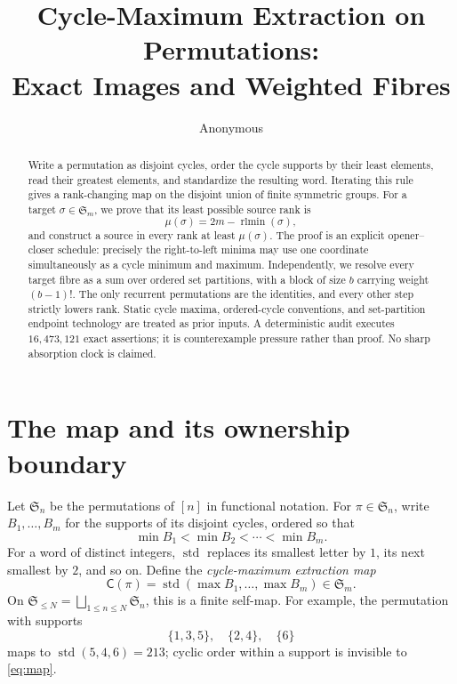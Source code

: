 \documentclass[a4paper,10pt]{amsart}
\title[Cycle-maximum extraction]{Cycle-Maximum Extraction on Permutations:\\
Exact Images and Weighted Fibres}
\author{Anonymous}
\date{}
\theoremstyle{remark}
\newcommand{\Sym}{\mathfrak S}
\newcommand{\std}{\operatorname{std}}
\newcommand{\CME}{\mathsf C}
\newcommand{\rtlmin}{\operatorname{rlmin}}
\begin{document}
\begin{abstract}
Write a permutation as disjoint cycles, order the cycle supports by their
least elements, read their greatest elements, and standardize the resulting
word.  Iterating this rule gives a rank-changing map on the disjoint union of
finite symmetric groups.  For a target $\sigma\in\Sym_m$, we prove that its
least possible source rank is
\[
 \mu(\sigma)=2m-\rtlmin(\sigma),
\]
and construct a source in every rank at least $\mu(\sigma)$.  The proof is an
explicit opener--closer schedule: precisely the right-to-left minima may use
one coordinate simultaneously as a cycle minimum and maximum.  Independently,
we resolve every target fibre as a sum over ordered set partitions, with a
block of size $b$ carrying weight $(b-1)!$.  The only recurrent permutations
are the identities, and every other step strictly lowers rank.  Static cycle
maxima, ordered-cycle conventions, and set-partition endpoint technology are
treated as prior inputs.  A deterministic audit executes $16{,}473{,}121$
exact assertions; it is counterexample pressure rather than proof.  No sharp
absorption clock is claimed.
\end{abstract}

\maketitle

\section{The map and its ownership boundary}\label{sec:map}

Let $\Sym_n$ be the permutations of $[n]$ in functional notation.  For
$\pi\in\Sym_n$, write $B_1,\ldots,B_m$ for the supports of its disjoint
cycles, ordered so that
\[
 \min B_1<\min B_2<\cdots<\min B_m.
\]
For a word of distinct integers, $\std$ replaces its smallest letter by $1$,
its next smallest by $2$, and so on.  Define the \emph{cycle-maximum
extraction map}
\begin{equation}\label{eq:map}
 \CME(\pi)=\std(\max B_1,\ldots,\max B_m)\in\Sym_m.
\end{equation}
On $\Sym_{\le N}=\bigsqcup_{1\le n\le N}\Sym_n$, this is a finite
self-map.  For example, the permutation with supports
\[
 \{1,3,5\},\quad\{2,4\},\quad\{6\}
\]
maps to $\std(5,4,6)=213$; cyclic order within a support is invisible to
\eqref{eq:map}.
\end{document}
